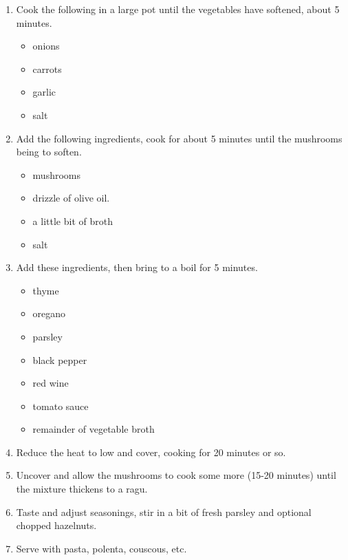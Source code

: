 \begin{enumerate}
\item Cook the following in a large pot until the vegetables have softened, about 5 minutes.
\begin{itemize}
    \item onions
    \item carrots
    \item garlic
    \item salt
\end{itemize}
\item Add the following ingredients, cook for about 5 minutes until the mushrooms being to soften.
\begin{itemize}
    \item mushrooms
    \item drizzle of olive oil.
    \item a little bit of broth
    \item salt
\end{itemize}
\item Add these ingredients, then bring to a boil for 5 minutes.
\begin{itemize}
    \item thyme
    \item oregano
    \item parsley
    \item black pepper
    \item red wine
    \item tomato sauce
    \item remainder of vegetable broth
\end{itemize}
\item Reduce the heat to low and cover, cooking for 20 minutes or so.
\item Uncover and allow the mushrooms to cook some more (15-20 minutes) until the mixture thickens to a ragu.
\item Taste and adjust seasonings, stir in a bit of fresh parsley and optional chopped hazelnuts.
\item Serve with pasta, polenta, couscous, etc.
\end{enumerate}
